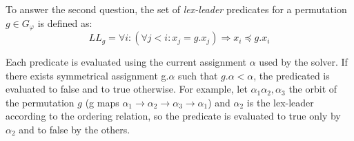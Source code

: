 %

To answer the second question, the set of \textit{lex-leader} predicates for a permutation $g \in G_\varphi$ is defined as:
$$LL_g = \forall i : (\forall j < i : x_j = g.x_j) \Rightarrow  x_i \preceq g.x_i$$


Each predicate is evaluated using the current assignment $\alpha$ used by the solver. 
If there exists symmetrical assignment g.$\alpha$ such that $g.\alpha < \alpha$, the predicated is evaluated to false and 
to true otherwise.
For example, let $\alpha_1 \alpha_2, \alpha_3$ the orbit of the permutation $g$ 
(g maps $\alpha_1 \rightarrow \alpha_2 \rightarrow \alpha_3 \rightarrow \alpha_1$) and $\alpha_2$ is the lex-leader 
according to the ordering relation, so the predicate is evaluated to true only by $\alpha_2$ and to false by the others.












